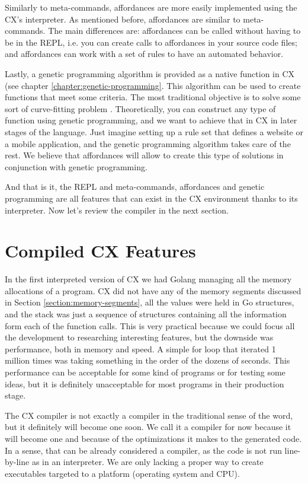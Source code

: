 \documentclass[11pt,fleqn,openany]{book} %
\begin{document}
Similarly to meta-commands, affordances are more easily implemented using the CX's interpreter. As mentioned before, affordances are similar to meta-commands. The main differences are: affordances can be called without having to be in the REPL, i.e. you can create calls to affordances in your source code files; and affordances can work with a set of rules to have an automated behavior.

Lastly, a genetic programming algorithm is provided as a native function in CX (see chapter \ref{chapter:genetic-programming}. This algorithm can be used to create functions that meet some criteria. The most traditional objective is to solve some sort of curve-fitting problem \cite{lancaster1986curve}. Theoretically, you can construct any type of function using genetic programming, and we want to achieve that in CX in later stages of the language. Just imagine setting up a rule set that defines a website or a mobile application, and the genetic programming algorithm takes care of the rest. We believe that affordances will allow to create this type of solutions in conjunction with genetic programming.

And that is it, the REPL and meta-commands, affordances and genetic programming are all features that can exist in the CX environment thanks to its interpreter. Now let's review the compiler in the next section.

\section{Compiled CX Features}

In the first interpreted version of CX we had Golang managing all the memory allocations of a program. CX did not have any of the memory segments discussed in Section \ref{section:memory-segments}, all the values were held in Go structures, and the stack was just a sequence of structures containing all the information form each of the function calls. This is very practical because we could focus all the development to researching interesting features, but the downside was performance, both in memory and speed. A simple for loop that iterated 1 million times was taking something in the order of the dozens of seconds. This performance can be acceptable for some kind of programs or for testing some ideas, but it is definitely unacceptable for most programs in their production stage.

The CX compiler is not exactly a compiler in the traditional sense of the word, but it definitely will become one soon. We call it a compiler for now because it will become one and because of the optimizations it makes to the generated code. In a sense, that can be already considered a compiler, as the code is not run line-by-line as in an interpreter. We are only lacking a proper way to create executables targeted to a platform (operating system and CPU).
\end{document}
